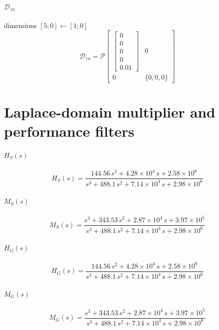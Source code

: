 \documentclass{article}
\newcommand{\PIop}[6]{\mathcal P\!\left[\begin{array}{c|c}#1&#2\\\hline#3&\{#4,#5,#6\}\end{array}\right]}
\begin{document}
\paragraph{$\mathcal D_{zu}$}\hfill dimensions $[5;0]\leftarrow[1;0]$
\[\displaystyle \mathcal D_{zu}=\PIop{\begin{bmatrix}0\\0\\0\\0\\0.01\end{bmatrix}}{0}{0}{0}{0}{0}\]
\section*{Laplace-domain multiplier and performance filters}
\paragraph{$H_S(s)$}
\[\displaystyle H_S(s)=\frac{144.56\,s^{2}+4.28\times10^{4}\,s+2.58\times10^{6}}{s^{3}+488.1\,s^{2}+7.14\times10^{4}\,s+2.98\times10^{6}}\]
\paragraph{$M_S(s)$}
\[\displaystyle M_S(s)=\frac{s^{3}+343.53\,s^{2}+2.87\times10^{4}\,s+3.97\times10^{5}}{s^{3}+488.1\,s^{2}+7.14\times10^{4}\,s+2.98\times10^{6}}\]
\paragraph{$H_G(s)$}
\[\displaystyle H_G(s)=\frac{144.56\,s^{2}+4.28\times10^{4}\,s+2.58\times10^{6}}{s^{3}+488.1\,s^{2}+7.14\times10^{4}\,s+2.98\times10^{6}}\]
\paragraph{$M_G(s)$}
\[\displaystyle M_G(s)=\frac{s^{3}+343.53\,s^{2}+2.87\times10^{4}\,s+3.97\times10^{5}}{s^{3}+488.1\,s^{2}+7.14\times10^{4}\,s+2.98\times10^{6}}\]
\end{document}
